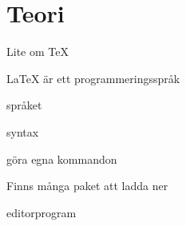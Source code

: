 \section{Teori}
Lite om {\TeX}


{\LaTeX} är ett programmeringsspråk 



språket

syntax

göra egna kommandon

Finns många paket att ladda ner

editorprogram